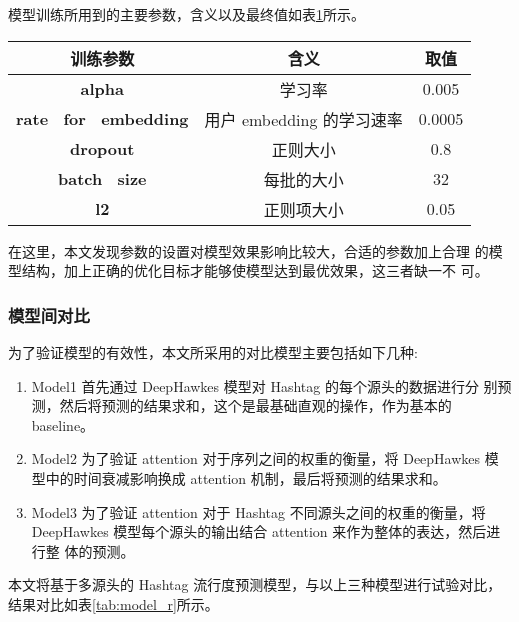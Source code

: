 模型训练所用到的主要参数，含义以及最终值如表\ref{tab:model_2}所示。

\begin{table}[H]
    \centering
    \footnotesize%
      \label{tab:model_2}
    \setlength{\tabcolsep}{30pt}%
    \renewcommand{\arraystretch}{1.2}%
    \begin{tabular}{ccc}
        \hline
       \textbf{ 训练参数} & \textbf{含义} & \textbf{取值}   \\
        \hline
        \textbf{alpha }& 学习率 & 0.005 \\
        \textbf{rate~ for~ embedding} &用户 embedding 的学习速率&0.0005 \\
       \textbf{ dropout} & 正则大小 &0.8 \\
        \textbf{batch ~size} & 每批的大小& 32 \\
      \textbf{  l2 }& 正则项大小
  &0.05\\
        	\hline
    \end{tabular}

\end{table}

在这里，本文发现参数的设置对模型效果影响比较大，合适的参数加上合理 的模型结构，加上正确的优化目标才能够使模型达到最优效果，这三者缺一不 可。

\subsubsection{模型间对比}
为了验证模型的有效性，本文所采用的对比模型主要包括如下几种:
\begin{enumerate}
\item Model1 首先通过 DeepHawkes 模型对 Hashtag 的每个源头的数据进行分 别预测，然后将预测的结果求和，这个是最基础直观的操作，作为基本的 baseline。
\item Model2 为了验证 attention 对于序列之间的权重的衡量，将 DeepHawkes 模型中的时间衰减影响换成 attention 机制，最后将预测的结果求和。
\item Model3 为了验证 attention 对于 Hashtag 不同源头之间的权重的衡量，将 DeepHawkes 模型每个源头的输出结合 attention 来作为整体的表达，然后进行整 体的预测。
\end{enumerate}


本文将基于多源头的 Hashtag 流行度预测模型，与以上三种模型进行试验对比，结果对比如表\ref{tab:model_r}所示。

